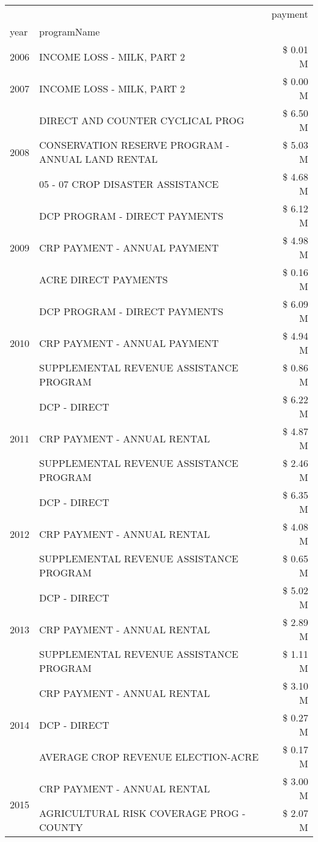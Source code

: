 \begin{tabular}{llr}
\toprule
 &  & payment \\
year & programName &  \\
\midrule
2006 & INCOME LOSS - MILK, PART 2 & \$ 0.01 M \\
\cline{1-3}
2007 & INCOME LOSS - MILK, PART 2 & \$ 0.00 M \\
\cline{1-3}
\multirow[t]{3}{*}{2008} & DIRECT AND COUNTER CYCLICAL PROG & \$ 6.50 M \\
 & CONSERVATION RESERVE PROGRAM - ANNUAL LAND RENTAL & \$ 5.03 M \\
 & 05 - 07 CROP DISASTER ASSISTANCE & \$ 4.68 M \\
\cline{1-3}
\multirow[t]{3}{*}{2009} & DCP PROGRAM - DIRECT PAYMENTS & \$ 6.12 M \\
 & CRP PAYMENT - ANNUAL PAYMENT & \$ 4.98 M \\
 & ACRE DIRECT PAYMENTS & \$ 0.16 M \\
\cline{1-3}
\multirow[t]{3}{*}{2010} & DCP PROGRAM - DIRECT PAYMENTS & \$ 6.09 M \\
 & CRP PAYMENT - ANNUAL PAYMENT & \$ 4.94 M \\
 & SUPPLEMENTAL REVENUE ASSISTANCE PROGRAM & \$ 0.86 M \\
\cline{1-3}
\multirow[t]{3}{*}{2011} & DCP - DIRECT & \$ 6.22 M \\
 & CRP PAYMENT - ANNUAL RENTAL & \$ 4.87 M \\
 & SUPPLEMENTAL REVENUE ASSISTANCE PROGRAM & \$ 2.46 M \\
\cline{1-3}
\multirow[t]{3}{*}{2012} & DCP - DIRECT & \$ 6.35 M \\
 & CRP PAYMENT - ANNUAL RENTAL & \$ 4.08 M \\
 & SUPPLEMENTAL REVENUE ASSISTANCE PROGRAM & \$ 0.65 M \\
\cline{1-3}
\multirow[t]{3}{*}{2013} & DCP - DIRECT & \$ 5.02 M \\
 & CRP PAYMENT - ANNUAL RENTAL & \$ 2.89 M \\
 & SUPPLEMENTAL REVENUE ASSISTANCE PROGRAM & \$ 1.11 M \\
\cline{1-3}
\multirow[t]{3}{*}{2014} & CRP PAYMENT - ANNUAL RENTAL & \$ 3.10 M \\
 & DCP - DIRECT & \$ 0.27 M \\
 & AVERAGE CROP REVENUE ELECTION-ACRE & \$ 0.17 M \\
\cline{1-3}
\multirow[t]{3}{*}{2015} & CRP PAYMENT - ANNUAL RENTAL & \$ 3.00 M \\
 & AGRICULTURAL RISK COVERAGE PROG - COUNTY & \$ 2.07 M \\

\end{tabular}

